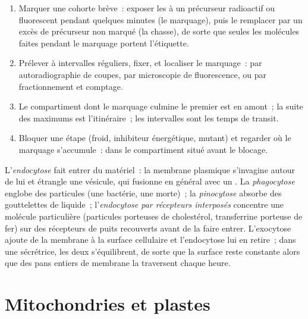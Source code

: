 \begin{method}\label{met:b1:eukaryotic-cell:pulsechase}
\begin{enumerate}
  \item Marquer une cohorte brève~: exposer les  à un
        précurseur radioactif ou fluorescent pendant quelques minutes
        (le marquage), puis le remplacer par un excès de précurseur non
        marqué (la chasse), de sorte que seules les molécules faites
        pendant le marquage portent l'étiquette.
  \item Prélever à intervalles réguliers, fixer, et localiser le
        marquage~: par autoradiographie de coupes, par microscopie de
        fluorescence, ou par fractionnement et comptage.
  \item Le compartiment dont le marquage culmine le premier est en
        amont~; la suite des maximums est l'itinéraire~; les intervalles
        sont les temps de transit.
  \item Bloquer une étape (froid, inhibiteur énergétique, mutant) et
        regarder où le marquage s'accumule~: dans le compartiment situé
        avant le blocage.
\end{enumerate}
\end{method}

\begin{definition}[Endocytose]\label{def:b1:eukaryotic-cell:endocytosis}
L'\emph{endocytose} fait entrer du matériel~: la
membrane plasmique s'invagine autour de lui et étrangle une vésicule,
qui fusionne en général avec un . La \emph{phagocytose} englobe
des particules (une bactérie, une  morte)~; la
\emph{pinocytose} absorbe des gouttelettes de liquide~;
l'\emph{endocytose par récepteurs interposés} concentre une molécule
particulière (particules porteuses de cholestérol, transferrine
porteuse de fer) sur des récepteurs de puits recouverts avant de la
faire entrer. L'exocytose ajoute de la membrane à la surface cellulaire
et l'endocytose lui en retire~; dans une  sécrétrice, les deux
s'équilibrent, de sorte que la surface reste constante alors que des
pans entiers de membrane la traversent chaque heure.
\end{definition}

\section{Mitochondries et plastes}

